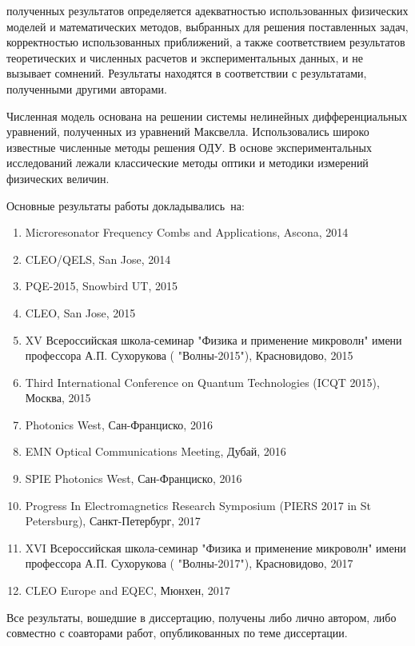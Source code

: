 {\reliability} полученных результатов определяется адекватностью использованных физических моделей и математических методов, выбранных для решения поставленных задач, корректностью использованных приближений, а также
соответствием результатов теоретических и численных расчетов и экспериментальных данных, и не вызывает сомнений. Результаты находятся в соответствии с результатами, полученными другими авторами.

Численная модель основана на решении системы нелинейных дифференциальных уравнений, полученных из уравнений Максвелла. Использовались широко известные численные методы решения ОДУ. В основе экспериментальных исследований лежали классические методы оптики и методики измерений физических величин.

{\probation}
Основные результаты работы докладывались~на:
\begin{enumerate}
  \item Microresonator Frequency Combs and Applications, Ascona, 2014
  \item CLEO/QELS, San Jose, 2014
  \item PQE-2015, Snowbird UT, 2015
  \item CLEO, San Jose, 2015
  \item XV Всероссийская школа-семинар "Физика и применение микроволн" имени профессора А.П. Сухорукова ( "Волны-2015"), Красновидово, 2015
  \item Third International Conference on Quantum Technologies (ICQT 2015), Москва, 2015
  \item Photonics West, Сан-Франциско, 2016
  \item EMN Optical Communications Meeting, Дубай, 2016
  \item SPIE Photonics West, Сан-Франциско, 2016
  \item Progress In Electromagnetics Research Symposium (PIERS 2017 in St Petersburg), Санкт-Петербург, 2017
  \item XVI Всероссийская школа-семинар "Физика и применение микроволн" имени профессора А.П. Сухорукова ( "Волны-2017"), Красновидово, 2017
  \item CLEO Europe and EQEC, Мюнхен, 2017
\end{enumerate}


{\contribution} Все результаты, вошедшие в диссертацию, получены либо лично
автором, либо совместно с соавторами работ, опубликованных по теме диссертации.


